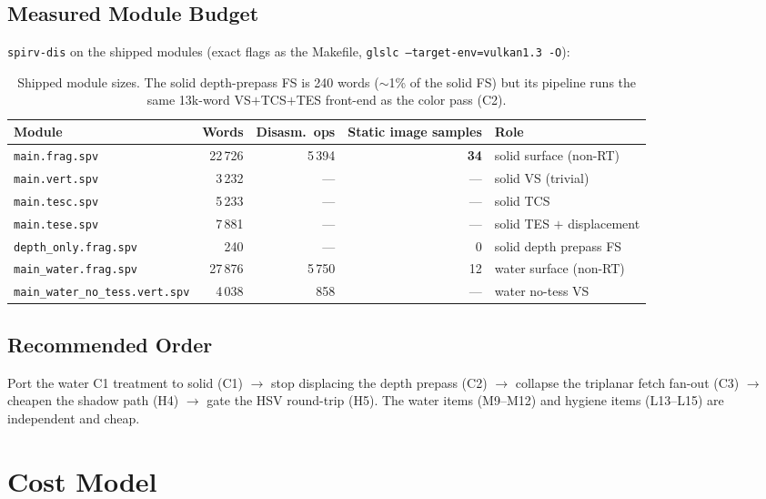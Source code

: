 \documentclass[11pt,a4paper]{article}
\begin{document}
\subsection{Measured Module Budget}

\texttt{spirv-dis} on the shipped modules (exact flags as the Makefile,
\texttt{glslc --target-env=vulkan1.3 -O}):

\begin{table}[h]
\centering
\small
\begin{tabular}{@{}lrrrl@{}}
\toprule
\textbf{Module} & \textbf{Words} & \textbf{Disasm.\ ops} & \textbf{Static image samples} & \textbf{Role} \\
\midrule
\texttt{main.frag.spv} & 22\,726 & 5\,394 & \textbf{34} & solid surface (non-RT) \\
\texttt{main.vert.spv} & 3\,232 & --- & --- & solid VS (trivial) \\
\texttt{main.tesc.spv} & 5\,233 & --- & --- & solid TCS \\
\texttt{main.tese.spv} & 7\,881 & --- & --- & solid TES $+$ displacement \\
\texttt{depth\_only.frag.spv} & 240 & --- & 0 & solid depth prepass FS \\
\texttt{main\_water.frag.spv} & 27\,876 & 5\,750 & 12 & water surface (non-RT) \\
\texttt{main\_water\_no\_tess.vert.spv} & 4\,038 & 858 & --- & water no-tess VS \\
\bottomrule
\end{tabular}
\caption{Shipped module sizes. The solid depth-prepass FS is 240 words
($\sim$1\% of the solid FS) but its pipeline runs the same 13k-word
VS$+$TCS$+$TES front-end as the color pass (C2).}
\end{table}

\subsection{Recommended Order}

Port the water C1 treatment to solid (C1) $\rightarrow$ stop displacing the
depth prepass (C2) $\rightarrow$ collapse the triplanar fetch fan-out (C3)
$\rightarrow$ cheapen the shadow path (H4) $\rightarrow$ gate the HSV
round-trip (H5). The water items (M9--M12) and hygiene items (L13--L15) are
independent and cheap.

\section{Cost Model}
\end{document}
